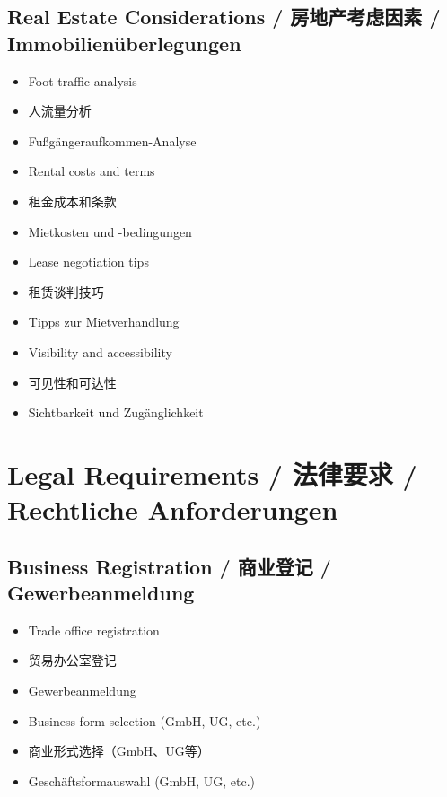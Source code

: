 \subsection{Real Estate Considerations / 房地产考虑因素 / Immobilienüberlegungen}
\begin{itemize}
    \item Foot traffic analysis
    \item 人流量分析
    \item Fußgängeraufkommen-Analyse
    \item Rental costs and terms
    \item 租金成本和条款
    \item Mietkosten und -bedingungen
    \item Lease negotiation tips
    \item 租赁谈判技巧
    \item Tipps zur Mietverhandlung
    \item Visibility and accessibility
    \item 可见性和可达性
    \item Sichtbarkeit und Zugänglichkeit
\end{itemize}

\section{Legal Requirements / 法律要求 / Rechtliche Anforderungen}

\subsection{Business Registration / 商业登记 / Gewerbeanmeldung}
\begin{itemize}
    \item Trade office registration
    \item 贸易办公室登记
    \item Gewerbeanmeldung
    \item Business form selection (GmbH, UG, etc.)
    \item 商业形式选择（GmbH、UG等）
    \item Geschäftsformauswahl (GmbH, UG, etc.)
\end{itemize}

